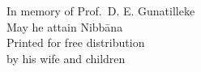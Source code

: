 
\clearpage
\begin{quotepage}{60mm}
In memory of Prof.~D. E. Gunatilleke\\
May he attain Nibbāna\\

Printed for free distribution\\
by his wife and children
\end{quotepage}
